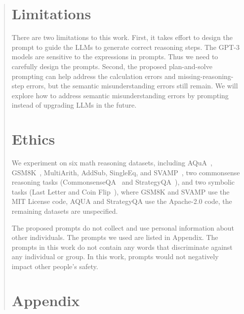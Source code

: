 \documentclass[11pt]{article}
\begin{document}
\begin{abstract}
\section{Limitations}

There are two limitations to this work. First, it takes effort to design the prompt to guide the LLMs to generate correct reasoning steps. The GPT-3 models are sensitive to the expressions in prompts. Thus we need to carefully design the prompts. Second, the proposed plan-and-solve prompting can help address the calculation errors and missing-reasoning-step errors, but the semantic misunderstanding errors still remain. We will explore how to address semantic misunderstanding errors by prompting instead of upgrading LLMs in the future.

\section{Ethics}
We experiment on six math reasoning datasets, including AQuA~\cite{aqua}, GSM8K~\cite{gsm8k}, MultiArith, AddSub, SingleEq, and SVAMP~\cite{svamp}, two commonsense reasoning tasks (CommonsenseQA~\cite{commonsenseqa} and StrategyQA~\cite{strategyqa}), and two symbolic tasks (Last Letter and Coin Flip~\cite{cot_wei}), where GSM8K and SVAMP use the MIT License code, AQUA and StrategyQA use the Apache-2.0 code, the remaining datasets are unspecified. 

The proposed prompts do not collect and use personal information about other individuals. The prompts we used are listed in Appendix. The prompts in this work do not contain any words that discriminate against any individual or group. In this work, prompts would not negatively impact other people's safety.





\section{Appendix}
\label{sec:appendix}


\end{abstract}
\end{document}
